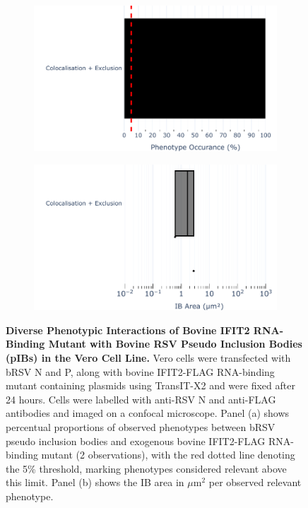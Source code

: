 \begin{figure}
    \begin{subfigure}{0.495\textwidth}
        \caption{}
        \includegraphics[width=1\linewidth]{09. Chapter 4/Figs/01. pIB/03. IFIT2/05. IFIT2-RNA binding mutant/02. pIB/04. bar_bi2f24_bnbp.pdf} 
    \end{subfigure}
    \begin{subfigure}{0.495\textwidth}
        \caption{}
        \includegraphics[width=1\linewidth]{09. Chapter 4/Figs/01. pIB/03. IFIT2/05. IFIT2-RNA binding mutant/02. pIB/05. box_bi2f24_bnbp.pdf}
    \end{subfigure}
    \caption[Diverse Phenotypic Interactions of Bovine IFIT2 RNA-Binding Mutant with Bovine RSV Pseudo Inclusion Bodies (pIBs) in the Vero Cell Line.]{\textbf{Diverse Phenotypic Interactions of Bovine IFIT2 RNA-Binding Mutant with Bovine RSV Pseudo Inclusion Bodies (pIBs) in the Vero Cell Line.} Vero cells were transfected with bRSV N and P, along with bovine IFIT2-FLAG RNA-binding mutant containing plasmids using TransIT-X2 and were fixed after 24 hours. Cells were labelled with anti-RSV N and anti-FLAG antibodies and imaged on a confocal microscope. Panel (a) shows percentual proportions of observed phenotypes between bRSV pseudo inclusion bodies and exogenous bovine IFIT2-FLAG RNA-binding mutant (2 observations), with the red dotted line denoting the 5\% threshold, marking phenotypes considered relevant above this limit. Panel (b) shows the IB area in \(\mu \mbox{m}^2\) per observed relevant phenotype.}
    \label{fig:Diverse Phenotypic Interactions of Bovine IFIT2 RNA-Binding Mutant with Bovine RSV Pseudo Inclusion Bodies (pIBs) in the Vero Cell Line}
\end{figure}

